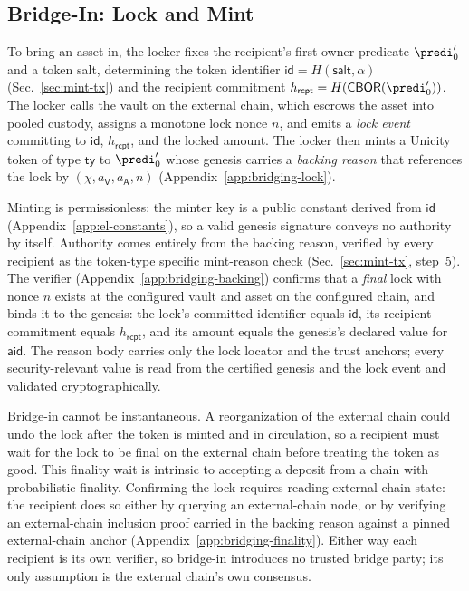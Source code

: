 \subsection{Bridge-In: Lock and Mint}\label{sec:bridge-in}

To bring an asset in, the locker fixes the recipient's first-owner predicate $\predi'_0$ and a token salt, determining the token identifier $\mathsf{id} = H(\mathsf{salt},\alpha)$ (Sec.~\ref{sec:mint-tx}) and the recipient commitment $h_\mathsf{rcpt} = H(\mathsf{CBOR}(\predi'_0))$. The locker calls the vault on the external chain, which escrows the asset into pooled custody, assigns a monotone lock nonce $n$, and emits a \emph{lock event} committing to $\mathsf{id}$, $h_\mathsf{rcpt}$, and the locked amount. The locker then mints a Unicity token of type $\mathsf{ty}$ to $\predi'_0$ whose genesis carries a \emph{backing reason} that references the lock by $(\chi, a_\mathsf{V}, a_\mathsf{A}, n)$ (Appendix~\ref{app:bridging-lock}).

Minting is permissionless: the minter key is a public constant derived from $\mathsf{id}$ (Appendix~\ref{app:el-constants}), so a valid genesis signature conveys no authority by itself. Authority comes entirely from the backing reason, verified by every recipient as the token-type specific mint-reason check (Sec.~\ref{sec:mint-tx}, step~5). The verifier (Appendix~\ref{app:bridging-backing}) confirms that a \emph{final} lock with nonce $n$ exists at the configured vault and asset on the configured chain, and binds it to the genesis: the lock's committed identifier equals $\mathsf{id}$, its recipient commitment equals $h_\mathsf{rcpt}$, and its amount equals the genesis's declared value for $\mathsf{aid}$. The reason body carries only the lock locator and the trust anchors; every security-relevant value is read from the certified genesis and the lock event and validated cryptographically.

Bridge-in cannot be instantaneous. A reorganization of the external chain could undo the lock after the token is minted and in circulation, so a recipient must wait for the lock to be final on the external chain before treating the token as good. This finality wait is intrinsic to accepting a deposit from a chain with probabilistic finality. Confirming the lock requires reading external-chain state: the recipient does so either by querying an external-chain node, or by verifying an external-chain inclusion proof carried in the backing reason against a pinned external-chain anchor (Appendix~\ref{app:bridging-finality}). Either way each recipient is its own verifier, so bridge-in introduces no trusted bridge party; its only assumption is the external chain's own consensus.

